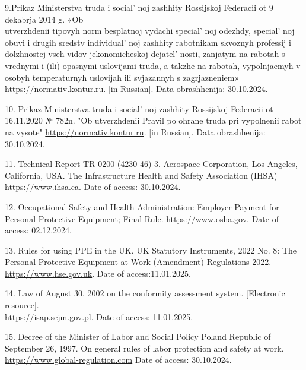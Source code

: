 \begin{references}
9.Prikaz Ministerstva truda i social' noj zashhity
Rossijskoj Federacii ot 9 dekabrja 2014 g. «Ob \\utverzhdenii tipovyh norm
besplatnoj vydachi special' noj odezhdy,
special' noj obuvi i drugih sredstv
individual' noj zashhity rabotnikam skvoznyh professij i
dolzhnostej vseh vidov jekonomicheskoj dejatel' nosti,
zanjatym na rabotah s vrednymi i (ili) opasnymi uslovijami truda, a
takzhe na rabotah, vypolnjaemyh v osobyh temperaturnyh uslovijah ili
svjazannyh s zagrjazneniem»
\href{https://normativ.kontur.ru/document?moduleId=1\&documentId=247205}{https://normativ.kontur.ru}. {[}in
Russian{]}. Data obrashhenija: 30.10.2024.

10. Prikaz Ministerstva truda i social' noj zashhity
Rossijskoj Federacii ot 16.11.2020 № 782n. "Ob utverzhdenii Pravil po
ohrane truda pri vypolnenii rabot na vysote"
\href{https://normativ.kontur.ru/document?moduleId=1\&documentId=379253\&ysclid=l9u855zqyi192989478}{https://normativ.kontur.ru}.
{[}in Russian{]}. Data obrashhenija: 30.10.2024.

11. Technical Report TR-0200 (4230-46)-3. Aerospace Corporation, Los
Angeles, California, USA. The Infrastructure Health and Safety
Association (IHSA) \href{https://www.ihsa.ca/topics_hazards/ppe.aspx}{https://www.ihsa.ca}.
Date of access: 30.10.2024.

12. Occupational Safety and Health Administration: Employer Payment for
Personal Protective Equipment; Final Rule.
\href{https://www.osha.gov/laws-regs/federalregister/2007-11-15-0}{https://www.osha.gov}. Date
of access: 02.12.2024.

13. Rules for using PPE in the UK. UK Statutory Instruments, 2022 No. 8:
The Personal Protective Equipment at Work (Amendment) Regulations 2022.
\href{https://www.hse.gov.uk/ppe/ppe-regulations-2022.htm\#:\textasciitilde:text=Under\%20PPER\%202022\%2C\%20the\%20types,on\%20the\%20use\%20of\%20PPE}{https://www.hse.gov.uk}.
Date of access:11.01.2025.

14. Law of August 30, 2002 on the conformity assessment system.
{[}Electronic resource{]}.\\
\href{https://isap.sejm.gov.pl/isap.nsf/DocDetails.xsp?id=WDU20021661360}{https://isap.sejm.gov.pl}. Date
of access: 11.01.2025.

15. Decree of the Minister of Labor and Social Policy Poland Republic of
September 26, 1997. On general rules of labor protection and safety at
work.
\href{https://www.global-regulation.com/translation/poland/2986216/regulation-of-the-minister-of-labour-and-social-policy-of-26-september-1997-on-general-provisions-of-occupational-safety-and-health.html}{https://www.global-regulation.com}
Date of access: 30.10.2024.


\end{references}

